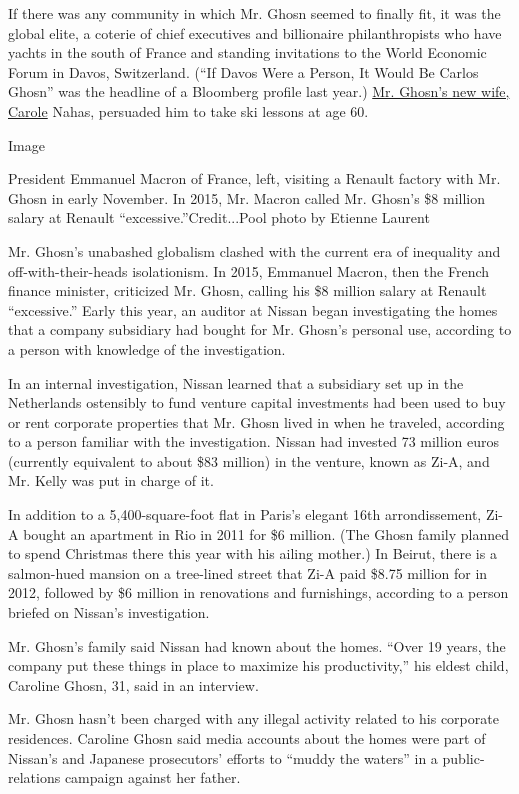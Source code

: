 If there was any community in which Mr. Ghosn seemed to finally fit, it
was the global elite, a coterie of chief executives and billionaire
philanthropists who have yachts in the south of France and standing
invitations to the World Economic Forum in Davos, Switzerland. (``If
Davos Were a Person, It Would Be Carlos Ghosn'' was the headline of a
Bloomberg profile last year.)
\href{https://www.nytimes.com/2020/01/07/business/carlos-ghosn-escape.html}{Mr.
Ghosn's new wife, Carole} Nahas, persuaded him to take ski lessons at
age 60.

Image

President Emmanuel Macron of France, left, visiting a Renault factory
with Mr. Ghosn in early November. In 2015, Mr. Macron called Mr. Ghosn's
\$8 million salary at Renault ``excessive.''Credit...Pool photo by
Etienne Laurent

Mr. Ghosn's unabashed globalism clashed with the current era of
inequality and off-with-their-heads isolationism. In 2015, Emmanuel
Macron, then the French finance minister, criticized Mr. Ghosn, calling
his \$8 million salary at Renault ``excessive.'' Early this year, an
auditor at Nissan began investigating the homes that a company
subsidiary had bought for Mr. Ghosn's personal use, according to a
person with knowledge of the investigation.

In an internal investigation, Nissan learned that a subsidiary set up in
the Netherlands ostensibly to fund venture capital investments had been
used to buy or rent corporate properties that Mr. Ghosn lived in when he
traveled, according to a person familiar with the investigation. Nissan
had invested 73 million euros (currently equivalent to about \$83
million) in the venture, known as Zi-A, and Mr. Kelly was put in charge
of it.

In addition to a 5,400-square-foot flat in Paris's elegant 16th
arrondissement, Zi-A bought an apartment in Rio in 2011 for \$6 million.
(The Ghosn family planned to spend Christmas there this year with his
ailing mother.) In Beirut, there is a salmon-hued mansion on a
tree-lined street that Zi-A paid \$8.75 million for in 2012, followed by
\$6 million in renovations and furnishings, according to a person
briefed on Nissan's investigation.

Mr. Ghosn's family said Nissan had known about the homes. ``Over 19
years, the company put these things in place to maximize his
productivity,'' his eldest child, Caroline Ghosn, 31, said in an
interview.

Mr. Ghosn hasn't been charged with any illegal activity related to his
corporate residences. Caroline Ghosn said media accounts about the homes
were part of Nissan's and Japanese prosecutors' efforts to ``muddy the
waters'' in a public-relations campaign against her father.


